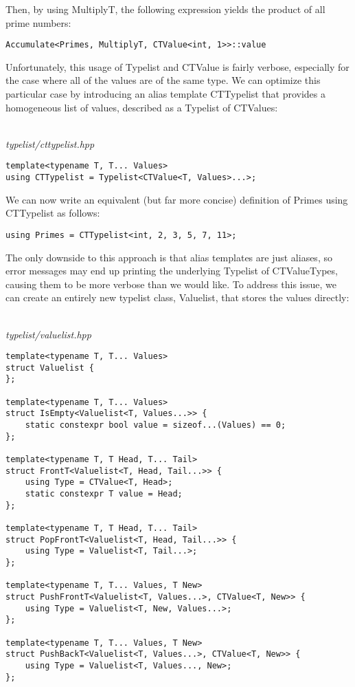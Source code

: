 Then, by using MultiplyT, the following expression yields the product of all prime numbers:

\begin{lstlisting}[style=styleCXX]
Accumulate<Primes, MultiplyT, CTValue<int, 1>>::value
\end{lstlisting}

Unfortunately, this usage of Typelist and CTValue is fairly verbose, especially for the case where all of the values are of the same type. We can optimize this particular case by introducing an alias template CTTypelist that provides a homogeneous list of values, described as a Typelist of CTValues:

\hspace*{\fill} \\ %
\noindent
\textit{typelist/cttypelist.hpp}
\begin{lstlisting}[style=styleCXX]
template<typename T, T... Values>
using CTTypelist = Typelist<CTValue<T, Values>...>;
\end{lstlisting}

We can now write an equivalent (but far more concise) definition of Primes using CTTypelist as follows:

\begin{lstlisting}[style=styleCXX]
using Primes = CTTypelist<int, 2, 3, 5, 7, 11>;
\end{lstlisting}

The only downside to this approach is that alias templates are just aliases, so error messages may end up printing the underlying Typelist of CTValueTypes, causing them to be more verbose than we would like. To address this issue, we can create an entirely new typelist class, Valuelist, that stores the values directly:

\hspace*{\fill} \\ %
\noindent
\textit{typelist/valuelist.hpp}
\begin{lstlisting}[style=styleCXX]
template<typename T, T... Values>
struct Valuelist {
};

template<typename T, T... Values>
struct IsEmpty<Valuelist<T, Values...>> {
	static constexpr bool value = sizeof...(Values) == 0;
};

template<typename T, T Head, T... Tail>
struct FrontT<Valuelist<T, Head, Tail...>> {
	using Type = CTValue<T, Head>;
	static constexpr T value = Head;
};

template<typename T, T Head, T... Tail>
struct PopFrontT<Valuelist<T, Head, Tail...>> {
	using Type = Valuelist<T, Tail...>;
};

template<typename T, T... Values, T New>
struct PushFrontT<Valuelist<T, Values...>, CTValue<T, New>> {
	using Type = Valuelist<T, New, Values...>;
};

template<typename T, T... Values, T New>
struct PushBackT<Valuelist<T, Values...>, CTValue<T, New>> {
	using Type = Valuelist<T, Values..., New>;
};
\end{lstlisting}

